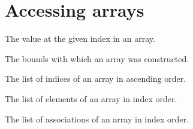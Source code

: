 \section{Accessing arrays}
\begin{haddockdesc}
\item[\begin{tabular}{@{}l}
(!) :: Ix i => Array i e -> i -> e
\end{tabular}]
{\haddockbegindoc
The value at the given index in an array.\par}
\end{haddockdesc}
\begin{haddockdesc}
\item[\begin{tabular}{@{}l}
bounds :: Array i e -> (i, i)
\end{tabular}]
{\haddockbegindoc
The bounds with which an array was constructed.\par}
\end{haddockdesc}
\begin{haddockdesc}
\item[\begin{tabular}{@{}l}
indices :: Ix i => Array i e -> {\char 91}i{\char 93}
\end{tabular}]
{\haddockbegindoc
The list of indices of an array in ascending order.\par}
\end{haddockdesc}
\begin{haddockdesc}
\item[\begin{tabular}{@{}l}
elems :: Array i e -> {\char 91}e{\char 93}
\end{tabular}]
{\haddockbegindoc
The list of elements of an array in index order.\par}
\end{haddockdesc}
\begin{haddockdesc}
\item[\begin{tabular}{@{}l}
assocs :: Ix i => Array i e -> {\char 91}(i, e){\char 93}
\end{tabular}]
{\haddockbegindoc
The list of associations of an array in index order.\par}
\end{haddockdesc}
